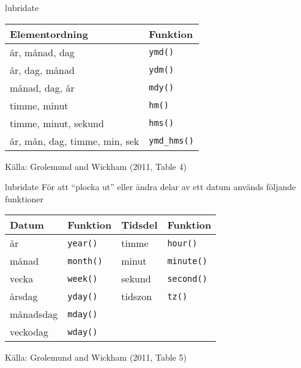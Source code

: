 \documentclass[
  11pt,
  ignorenonframetext,
  handout]{beamer}
\begin{document}
\begin{frame}[fragile]{lubridate}
\protect\hypertarget{lubridate-1}{}
\begin{longtable}[]{@{}ll@{}}
\toprule
Elementordning & Funktion \\
\midrule
\endhead
år, månad, dag & \texttt{ymd()} \\
år, dag, månad & \texttt{ydm()} \\
månad, dag, år & \texttt{mdy()} \\
timme, minut & \texttt{hm()} \\
timme, minut, sekund & \texttt{hms()} \\
år, mån, dag, timme, min, sek & \texttt{ymd\_hms()} \\
\bottomrule
\end{longtable}

Källa: Grolemund and Wickham (2011, Table 4)
\end{frame}

\begin{frame}[fragile]{lubridate}
\protect\hypertarget{lubridate-2}{}
För att ``plocka ut'' eller ändra delar av ett datum används följande
funktioner

\begin{longtable}[]{@{}llll@{}}
\toprule
Datum & Funktion & Tidsdel & Funktion \\
\midrule
\endhead
år & \texttt{year()} & timme & \texttt{hour()} \\
månad & \texttt{month()} & minut & \texttt{minute()} \\
vecka & \texttt{week()} & sekund & \texttt{second()} \\
årsdag & \texttt{yday()} & tidszon & \texttt{tz()} \\
månadsdag & \texttt{mday()} & & \\
veckodag & \texttt{wday()} & & \\
\bottomrule
\end{longtable}

Källa: Grolemund and Wickham (2011, Table 5)
\end{frame}
\end{document}
